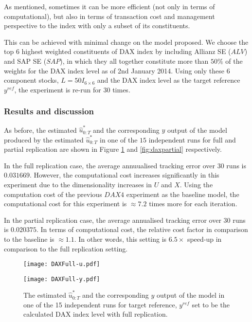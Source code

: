 As mentioned, sometimes it can be more efficient (not only in terms of computational), but also in terms of transaction cost and management perspective to the index with only a subset of its constituents.

This can be achieved with minimal change on the model proposed. We choose the top $6$ highest weighted constituents of DAX index by including Allianz SE ($ALV$) and SAP SE ($SAP$), in which they all together constitute more than $50\%$ of the weights for the DAX index level as of 2nd January 2014. Using only these $6$ component stocks, $L=50I_{6 \times 6}$ and the DAX index level as the target reference $y^{ref}$, the experiment is re-run for $30$ times.

\subsubsection{Results and discussion}
As before, the estimated $\hat{u}^*_{0:T}$ and the corresponding $y$ output of the model produced by the estimated $\hat{u}^*_{0:T}$ in one of the $15$ independent runs for full and partial replication are shown in Figure \ref{fig:dax} and \ref{fig:daxpartial} respectively.

In the full replication case, the average annuualised tracking error over $30$ runs is $0.031669$. However, the computational cost increases significantly in this experiment due to the dimensionality increases in $U$ and $X$. Using the computation cost of the previous $DAX4$ experiment as the baseline model, the computational cost for this experiment is $\approx 7.2$ times more for each iteration.

In the partial replication case, the average annualised tracking error over $30$ runs is $0.020375$. In terms of computational cost, the relative cost factor in comparison to the baseline is $\approx 1.1$. In other words, this setting is $6.5\times$ speed-up in comparison to the full replication setting.

\begin{figure}[htbp]
\centering
    \begin{minipage}{0.5\textwidth}
        \centering
        \texttt{[image: DAXFull-u.pdf]}
    \end{minipage}%
    \begin{minipage}{0.5\textwidth}
        \centering
        \texttt{[image: DAXFull-y.pdf]}
    \end{minipage}
\caption{The estimated $\hat{u}^*_{0:T}$ and the corresponding $y$ output of the model in one of the 15 independent runs for target reference, $y^{ref}$ set to be the calculated DAX index level with full replication.}
\label{fig:dax}
\end{figure}

